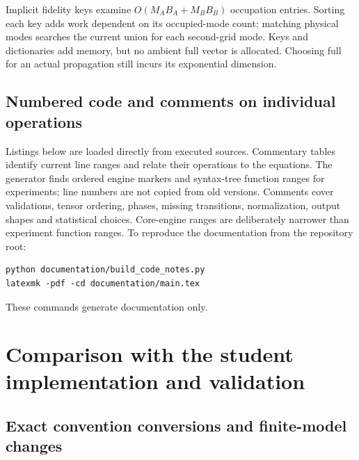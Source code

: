 \documentclass[11pt,a4paper]{article}
\begin{document}
Implicit fidelity keys examine $O(M_AB_A+M_BB_B)$ occupation entries.
Sorting each key adds work dependent on its occupied-mode count; matching
physical modes searches the current union for each second-grid mode.
Keys and dictionaries add memory, but no ambient full vector is allocated.
Choosing full for an actual propagation still incurs its exponential dimension.

\subsection{Numbered code and comments on individual operations}
Listings below are loaded directly from executed sources. Commentary tables
identify current line ranges and relate their operations to the equations.
The generator finds ordered engine markers and syntax-tree function ranges
for experiments; line numbers are not copied from old versions. Comments
cover validations, tensor ordering, phases, missing transitions, normalization,
output shapes and statistical choices. Core-engine ranges are deliberately
narrower than experiment function ranges.
To reproduce the documentation from the repository root:
\begin{lstlisting}[language={}]
python documentation/build_code_notes.py
latexmk -pdf -cd documentation/main.tex
\end{lstlisting}
These commands generate documentation only.


\section{Comparison with the student implementation and validation}
\subsection{Exact convention conversions and finite-model changes}
\end{document}
